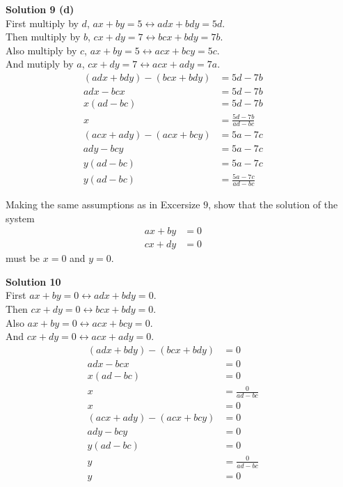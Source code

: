 \documentclass[6pt]{article}
\begin{document}
\textbf{Solution 9 (d)} \\
First multiply by $d$, $ax + by = 5 \leftrightarrow adx + bdy = 5d$. \\
Then multiply by $b$, $cx + dy = 7 \leftrightarrow bcx + bdy = 7b$. \\
Also multiply by $c$, $ax + by = 5 \leftrightarrow acx + bcy = 5c$. \\
And mutiply by $a$, $cx + dy  = 7 \leftrightarrow acx + ady = 7a$. 
\begin{align*}
    (adx + bdy) - (bcx + bdy) &= 5d - 7b && \\
    adx - bcx &= 5d - 7b && \\
    x(ad - bc) &= 5d - 7b && \\
    x &= \frac{5d - 7b}{ad - bc}
\end{align*}
\begin{align*}
    (acx + ady) - (acx + bcy) &= 5a - 7c && \\
    ady - bcy &= 5a - 7c && \\
    y(ad - bc) &= 5a - 7c && \\
    y(ad - bc) &= \frac{5a - 7c}{ad - bc} 
\end{align*}

\begin{tcolorbox}[title=Problem 10, breakable]
    Making the same assumptions as in Excersize $9$, show that the solution
    of the system
    \begin{align*}
        ax + by &= 0 && \\
        cx + dy &= 0
    \end{align*}
    must be $x = 0$ and $y = 0$.
\end{tcolorbox}

\textbf{Solution 10} \\
First $ax + by = 0 \leftrightarrow adx + bdy = 0$. \\
Then $cx + dy = 0 \leftrightarrow bcx + bdy = 0$. \\
Also $ax + by = 0 \leftrightarrow acx + bcy = 0$. \\
And $cx + dy = 0 \leftrightarrow acx + ady = 0$. 
\begin{align*}
    (adx + bdy) - (bcx + bdy) &= 0 && \\
    adx - bcx &= 0 && \\
    x(ad - bc) &= 0 && \\
    x &= \frac{0}{ad - bc} \\ 
    x &= 0
\end{align*}
\begin{align*}
    (acx + ady) - (acx + bcy) &= 0 && \\
    ady - bcy &= 0 && \\
    y(ad - bc) &= 0 && \\
    y &= \frac{0}{ad - bc} && \\
    y &= 0
\end{align*}
\end{document}
